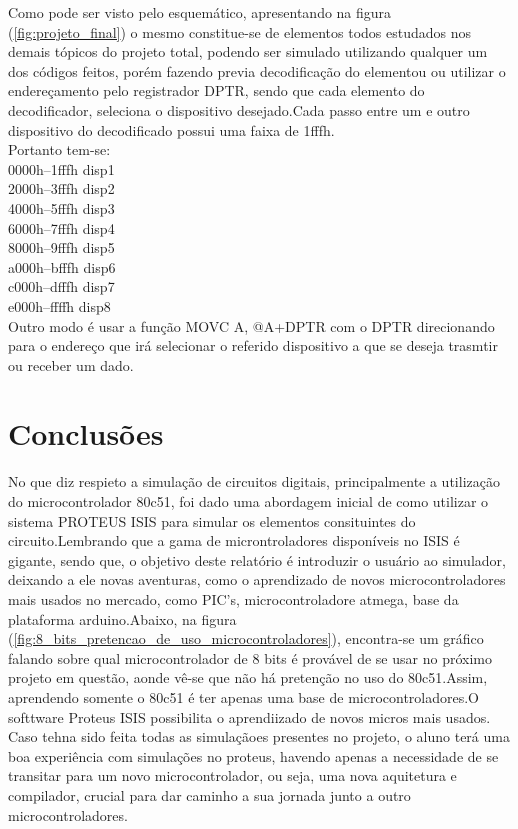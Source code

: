 \documentclass{Fabiano_file}
\begin{document}
{Como pode ser visto pelo esquemático, apresentando na figura (\ref{fig:projeto_final}) o mesmo constitue-se de elementos todos estudados nos demais tópicos do 
projeto total, podendo ser simulado utilizando qualquer um dos
códigos feitos, porém fazendo previa decodificação do elementou ou utilizar o endereçamento pelo registrador DPTR, sendo que cada elemento do decodificador,
seleciona o dispositivo desejado.Cada passo entre um e outro dispositivo do decodificado possui uma faixa de 1fffh.\\
Portanto tem-se:\\
0000h--1fffh  disp1\\
2000h--3fffh  disp2\\
4000h--5fffh  disp3\\
6000h--7fffh  disp4\\
8000h--9fffh  disp5\\
a000h--bfffh  disp6\\
c000h--dfffh  disp7\\
e000h--ffffh  disp8\\
Outro modo é usar a função MOVC A, @A+DPTR com o DPTR direcionando para o endereço que irá selecionar o referido dispositivo a que se deseja trasmtir ou 
receber um dado.

\section{Conclusões}
No que diz respieto a simulação de circuitos digitais, principalmente a utilização do microcontrolador 80c51, foi dado uma abordagem inicial de como utilizar o
sistema PROTEUS ISIS para simular os elementos consituintes do circuito.Lembrando que a gama de microntroladores disponíveis no ISIS é gigante, sendo que, o
objetivo deste relatório é introduzir o usuário ao simulador, deixando a ele novas aventuras, como o aprendizado de novos microcontroladores mais usados no 
mercado, como PIC's, microcontroladore atmega, base da plataforma arduino.Abaixo, na figura (\ref{fig:8_bits_pretencao_de_uso_microcontroladores}), 
encontra-se um gráfico falando sobre qual microcontrolador de 8 bits é provável de se usar no próximo projeto em questão, aonde vê-se que não há pretenção 
no uso do 80c51.Assim, aprendendo somente o 80c51 é ter apenas uma base de microcontroladores.O softtware Proteus ISIS  possibilita o aprendiizado de 
novos micros mais usados. Caso tehna sido feita todas as simulaçãoes presentes no projeto, o aluno terá uma boa experiência com simulações no proteus, havendo
apenas a necessidade de se transitar para um novo microcontrolador, ou seja, uma nova aquitetura e compilador, crucial para dar  caminho a 
sua jornada junto a outro microcontroladores.

}
\end{document}
